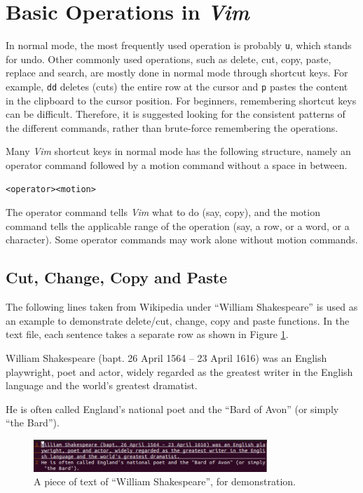 \section{Basic Operations in \textit{Vim}}

In normal mode, the most frequently used operation is probably \verb|u|, which stands for undo. Other commonly used operations, such as delete, cut, copy, paste, replace and search, are mostly done in normal mode through shortcut keys. For example, \verb|dd| deletes (cuts) the entire row at the cursor and \verb|p| pastes the content in the clipboard to the cursor position. For beginners, remembering shortcut keys can be difficult. Therefore, it is suggested looking for the consistent patterns of the different commands, rather than brute-force remembering the operations.

Many \textit{Vim} shortcut keys in normal mode has the following structure, namely an operator command followed by a motion command without a space in between.
\begin{lstlisting}
<operator><motion>
\end{lstlisting}
The operator command tells \textit{Vim} what to do (say, copy), and the motion command tells the applicable range of the operation (say, a row, or a word, or a character). Some operator commands may work alone without motion commands.

\subsection{Cut, Change, Copy and Paste}

The following lines taken from Wikipedia under ``William Shakespeare'' is used as an example to demonstrate delete/cut, change, copy and paste functions. In the text file, each sentence takes a separate row as shown in Figure \ref{ch:tfe:fig:vimdemo1}.

\begin{shortbox}
William Shakespeare (bapt. 26 April 1564 – 23 April 1616) was an English playwright, poet and actor, widely regarded as the greatest writer in the English language and the world's greatest dramatist.

He is often called England's national poet and the ``Bard of Avon'' (or simply ``the Bard'').
\end{shortbox}

\begin{figure}[htbp]
\centering
\includegraphics[width=250pt]{chapters/ch-text-file-editing/figures/vimdemo1.png}
\caption{A piece of text of ``William Shakespeare'', for demonstration.} \label{ch:tfe:fig:vimdemo1}
\end{figure}

